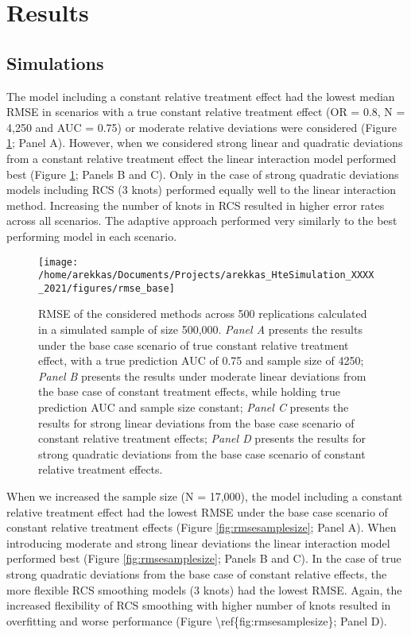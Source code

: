 \documentclass{article}
\begin{document}
\hypertarget{results}{%
\section{Results}\label{results}}

\hypertarget{simulations}{%
\subsection{Simulations}\label{simulations}}

The model including a constant relative treatment effect had the lowest
median RMSE in scenarios with a true constant relative treatment effect
(OR = 0.8, N = 4,250 and AUC = 0.75) or moderate relative deviations
were considered (Figure \ref{fig:rmsebase}; Panel A). However, when we
considered strong linear and quadratic deviations from a constant
relative treatment effect the linear interaction model performed best
(Figure \ref{fig:rmsebase}; Panels B and C). Only in the case of strong
quadratic deviations models including RCS (3 knots) performed equally
well to the linear interaction method. Increasing the number of knots in
RCS resulted in higher error rates across all scenarios. The adaptive
approach performed very similarly to the best performing model in each
scenario.

\begin{figure}
\texttt{[image: /home/arekkas/Documents/Projects/arekkas\_HteSimulation\_XXXX\_2021/figures/rmse\_base]} \caption{RMSE of the considered methods across 500 replications calculated in a simulated sample of size 500,000. \textit{Panel A} presents the results under the base case scenario of true constant relative treatment effect, with a true prediction AUC of 0.75 and sample size of 4250; \textit{Panel B} presents the results under moderate linear deviations from the base case of constant treatment effects, while holding true prediction AUC and sample size constant; \textit{Panel C} presents the results for strong linear deviations from the base case scenario of constant relative treatment effects; \textit{Panel D} presents the results for strong quadratic deviations from the base case scenario of constant relative treatment effects.}\label{fig:rmsebase}
\end{figure}

When we increased the sample size (N = 17,000), the model including a
constant relative treatment effect had the lowest RMSE under the base
case scenario of constant relative treatment effects (Figure
\ref{fig:rmsesamplesize}; Panel A). When introducing moderate and strong
linear deviations the linear interaction model performed best (Figure
\ref{fig:rmsesamplesize}; Panels B and C). In the case of true strong
quadratic deviations from the base case of constant relative effects,
the more flexible RCS smoothing models (3 knots) had the lowest RMSE.
Again, the increased flexibility of RCS smoothing with higher number of
knots resulted in overfitting and worse performance (Figure
\textbackslash ref\{fig:rmsesamplesize\}; Panel D).
\end{document}
